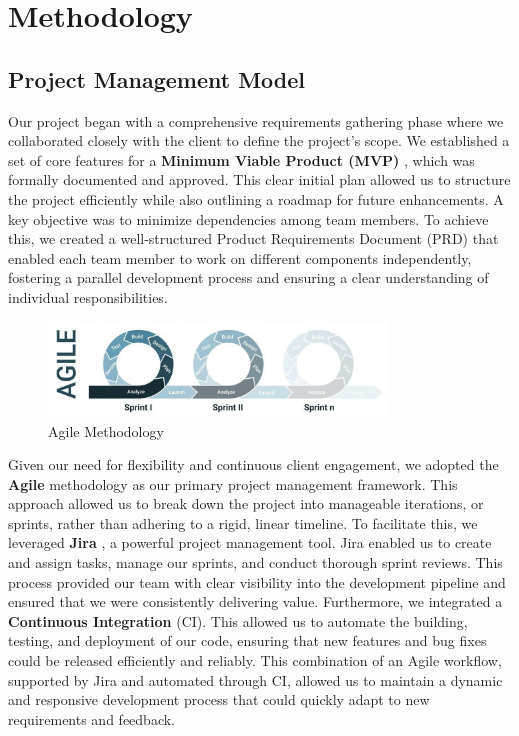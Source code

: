 
\chapter{Methodology}
\section{ Project Management Model}

Our project began with a comprehensive requirements gathering phase where we collaborated closely with the client to define the project's scope. We established a set of core features for a \textbf{Minimum Viable Product (MVP)} \cite{atlassian_mvp}, which was formally documented and approved. This clear initial plan allowed us to structure the project efficiently while also outlining a roadmap for future enhancements. A key objective was to minimize dependencies among team members. To achieve this, we created a well-structured Product Requirements Document (PRD) \cite{atlassian_requirements} that enabled each team member to work on different components independently, fostering a parallel development process and ensuring a clear understanding of individual responsibilities.

\begin{figure}[h]
    \centering
    \includegraphics[width=0.8\textwidth]{agile.jpeg}
    \caption{Agile Methodology}
    \label{fig:agile}
\end{figure}

Given our need for flexibility and continuous client engagement, we adopted the \textbf{Agile} methodology \cite{atlassian_agile} as our primary project management framework. This approach allowed us to break down the project into manageable iterations, or sprints, rather than adhering to a rigid, linear timeline. To facilitate this, we leveraged \textbf{Jira} \cite{atlassian_jira}, a powerful project management tool. Jira enabled us to create and assign tasks, manage our sprints, and conduct thorough sprint reviews. This process provided our team with clear visibility into the development pipeline and ensured that we were consistently delivering value. Furthermore, we integrated a \textbf{Continuous Integration} (CI)\cite{atlassian_ci}. This allowed us to automate the building, testing, and deployment of our code, ensuring that new features and bug fixes could be released efficiently and reliably. This combination of an Agile workflow, supported by Jira and automated through CI, allowed us to maintain a dynamic and responsive development process that could quickly adapt to new requirements and feedback.

